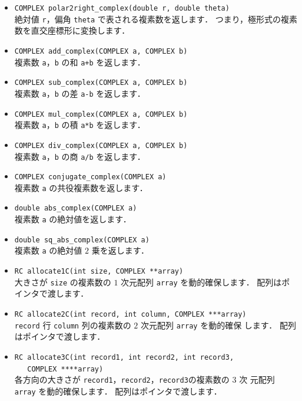 \begin{itemize}
\item \verb|COMPLEX polar2right_complex(double r, double theta)| \ \\
絶対値 \verb|r|，偏角 \verb|theta| で表される複素数を返します．
つまり，極形式の複素数を直交座標形に変換します．

\item \verb|COMPLEX add_complex(COMPLEX a, COMPLEX b)| \ \\
複素数 \verb|a|，\verb|b| の和 \verb|a+b| を返します．

\item \verb|COMPLEX sub_complex(COMPLEX a, COMPLEX b)| \ \\
複素数 \verb|a|，\verb|b| の差 \verb|a-b| を返します．

\item \verb|COMPLEX mul_complex(COMPLEX a, COMPLEX b)| \ \\
複素数 \verb|a|，\verb|b| の積 \verb|a*b| を返します．

\item \verb|COMPLEX div_complex(COMPLEX a, COMPLEX b)| \ \\
複素数 \verb|a|，\verb|b| の商 \verb|a/b| を返します．

\item \verb|COMPLEX conjugate_complex(COMPLEX a)| \ \\
複素数 \verb|a| の共役複素数を返します．

\item \verb|double abs_complex(COMPLEX a)| \ \\
複素数 \verb|a| の絶対値を返します．

\item \verb|double sq_abs_complex(COMPLEX a)| \ \\
複素数 \verb|a| の絶対値 $2$ 乗を返します．

\item \verb|RC allocate1C(int size, COMPLEX **array)| \ \\
大きさが \verb|size| の複素数の $1$ 次元配列 \verb|array| を動的確保します．
配列はポインタで渡します．

\item \verb|RC allocate2C(int record, int column, COMPLEX ***array)| \ \\
\verb|record| 行 \verb|column| 列の複素数の $2$ 次元配列 \verb|array| を動的確保
します．
配列はポインタで渡します．

\item \verb|RC allocate3C(int record1, int record2, int record3, | \\
	\verb|   COMPLEX ****array)| \ \\
各方向の大きさが \verb|record1|，\verb|record2|，\verb|record3|の複素数の $3$ 次
元配列 \verb|array| を動的確保します．
配列はポインタで渡します．


\end{itemize}
